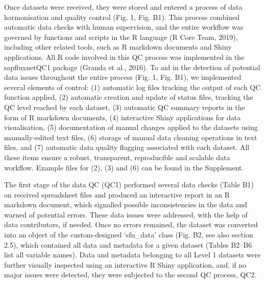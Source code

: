 \documentclass[11pt,twoside]{reedthesis}
\begin{document}
Once datasets were received, they were stored and entered a process of
data harmonisation and quality control (Fig. 1, Fig. B1). This process
combined automatic data checks with human supervision, and the entire
workflow was governed by functions and scripts in the R language (R Core
Team, 2019), including other related tools, such as R markdown documents
and Shiny applications. All R code involved in this QC process was
implemented in the sapfluxnetQC1 package (Granda et al., 2016). To aid
in the detection of potential data issues throughout the entire process
(Fig. 1, Fig. B1), we implemented several elements of control: (1)
automatic log files tracking the output of each QC function applied, (2)
automatic creation and update of status files, tracking the QC level
reached by each dataset, (3) automatic QC summary reports in the form of
R markdown documents, (4) interactive Shiny applications for data
visualisation, (5) documentation of manual changes applied to the
datasets using manually-edited text files, (6) storage of manual data
cleaning operations in text files, and (7) automatic data quality
flagging associated with each dataset. All these items ensure a robust,
transparent, reproducible and scalable data workflow. Example files for
(2), (3) and (6) can be found in the Supplement.\par

The first stage of the data QC (QC1) performed several data checks
(Table B1) on received spreadsheet files and produced an interactive
report in an R markdown document, which signalled possible
inconsistencies in the data and warned of potential errors. These data
issues were addressed, with the help of data contributors, if needed.
Once no errors remained, the dataset was converted into an object of the
custom-designed `sfn\_data' class (Fig. B2, see also section 2.5), which
contained all data and metadata for a given dataset (Tables B2--B6 list
all variable names). Data and metadata belonging to all Level 1 datasets
were further visually inspected using an interactive R Shiny
application, and, if no major issues were detected, they were subjected
to the second QC process, QC2.\par
\end{document}
